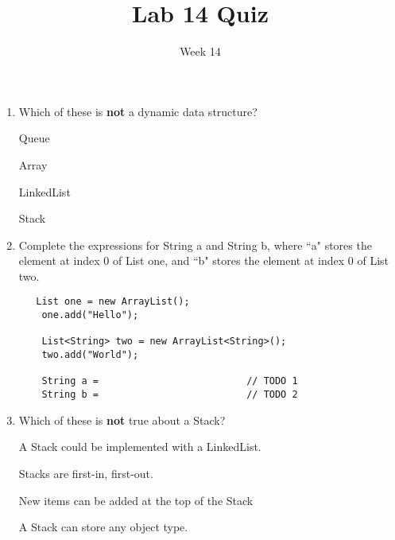 \documentclass[addpoints]{exam}
\title{Lab 14 Quiz}
\date{Week 14}
\begin{document}
 

\Instructions
\begin{enumerate}
\newline
\item {}
Which of these is \textbf{not} a dynamic data structure?

\begin{oneparchoices} 
\hspace{0.2cm}
 
 \choice Queue \newline
 
 \choice Array \newline
 
 \choice LinkedList\newline
 
 \choice Stack \newline
 \end{oneparchoices}
 
\item {} Complete the expressions for String a and String b, where ``a" stores the element at index 0 of List one, and ``b" stores the element at index 0 of List two.

\begin{lstlisting}
   List one = new ArrayList();
	one.add("Hello");
	
	List<String> two = new ArrayList<String>();
	two.add("World");

	String a =                          // TODO 1
	String b =                          // TODO 2

\end{lstlisting}

\item {}
Which of these is \textbf{not} true about a Stack?

\begin{oneparchoices} 
\hspace{0.2cm}
 
 \choice  A Stack could be implemented with a LinkedList. \newline
 
 \choice Stacks are first-in, first-out. \newline
 
 \choice New items can be added at the top of the Stack \newline
 
 \choice A Stack can store any object type. \newline
 \end{oneparchoices}


\end{enumerate}
\end{document}
